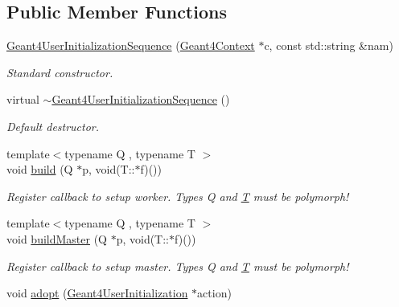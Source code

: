 \subsection*{Public Member Functions}
\begin{DoxyCompactItemize}
\item 
\hyperlink{class_d_d4hep_1_1_simulation_1_1_geant4_user_initialization_sequence_a6e8c9a4df7e03c8f26b25684f982f2cd}{Geant4\+User\+Initialization\+Sequence} (\hyperlink{class_d_d4hep_1_1_simulation_1_1_geant4_context}{Geant4\+Context} $\ast$c, const std\+::string \&nam)
\begin{DoxyCompactList}\small\item\em Standard constructor. \end{DoxyCompactList}\item 
virtual \hyperlink{class_d_d4hep_1_1_simulation_1_1_geant4_user_initialization_sequence_aa593a6ec771aea3c621f4da1cb2beaf6}{$\sim$\+Geant4\+User\+Initialization\+Sequence} ()
\begin{DoxyCompactList}\small\item\em Default destructor. \end{DoxyCompactList}\item 
{\footnotesize template$<$typename Q , typename T $>$ }\\void \hyperlink{class_d_d4hep_1_1_simulation_1_1_geant4_user_initialization_sequence_a47c04fa2bb3a03bf1754a9f4c4d1eacf}{build} (Q $\ast$p, void(T\+::$\ast$f)())
\begin{DoxyCompactList}\small\item\em Register callback to setup worker. Types Q and \hyperlink{class_t}{T} must be polymorph! \end{DoxyCompactList}\item 
{\footnotesize template$<$typename Q , typename T $>$ }\\void \hyperlink{class_d_d4hep_1_1_simulation_1_1_geant4_user_initialization_sequence_a8b77abdff57e230fd1a5887c360c078c}{build\+Master} (Q $\ast$p, void(T\+::$\ast$f)())
\begin{DoxyCompactList}\small\item\em Register callback to setup master. Types Q and \hyperlink{class_t}{T} must be polymorph! \end{DoxyCompactList}\item 
void \hyperlink{class_d_d4hep_1_1_simulation_1_1_geant4_user_initialization_sequence_a00f01d23b874b3c99c6877ce01b6b702}{adopt} (\hyperlink{class_d_d4hep_1_1_simulation_1_1_geant4_user_initialization}{Geant4\+User\+Initialization} $\ast$action)

\end{DoxyCompactItemize}
